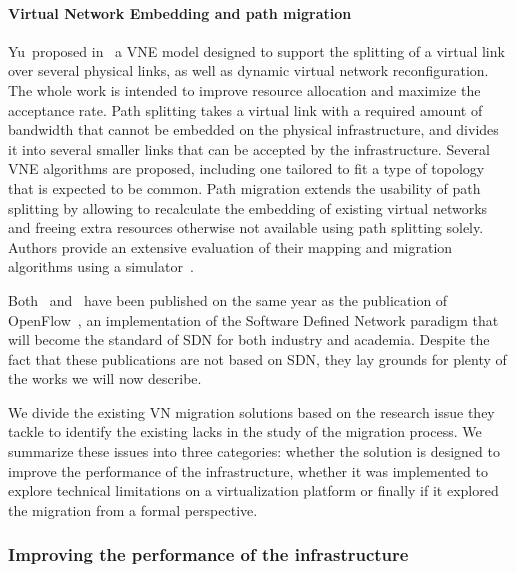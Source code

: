 \paragraph{Virtual Network Embedding and path migration}
Yu~\etal proposed in~\cite{VNE-Yu2008} a VNE model designed to support the splitting of a virtual link over several physical links, as well as dynamic virtual network reconfiguration.
The whole work is intended to improve resource allocation and maximize the acceptance rate. 
Path splitting takes a virtual link with a required amount of bandwidth that cannot be embedded on the physical infrastructure, and divides it into several smaller links that can be accepted by the infrastructure.
Several VNE algorithms are proposed, including one tailored to fit a type of topology that is expected to be common.
Path migration extends the usability of path splitting by allowing to recalculate the embedding of existing virtual networks and freeing extra resources otherwise not available using path splitting solely.
Authors provide an extensive evaluation of their mapping and migration algorithms using a simulator~\cite{vnesimulator}.

Both~\cite{VROOM-Wang2008} and~\cite{VNE-Yu2008} have been published on the same year as the publication of OpenFlow~\cite{Openflow-McKeown2008}, an implementation of the Software Defined Network paradigm that will become the standard of SDN for both industry and academia.
Despite the fact that these publications are not based on SDN, they lay grounds for plenty of the works we will now describe.

We divide the existing VN migration solutions based on the research issue they tackle to identify the existing lacks in the study of the migration process.
We summarize these issues into three categories: whether the solution is designed to improve the performance of the infrastructure, whether it was implemented to explore technical limitations on a virtualization platform or finally if it explored the migration from a formal perspective.

\subsubsection{Improving the performance of the infrastructure}


